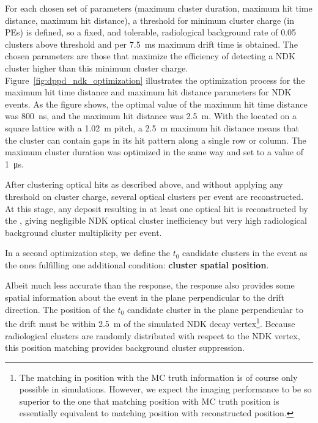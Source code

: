 For each chosen set of parameters (maximum cluster duration, maximum hit time distance, maximum hit distance), a threshold for minimum cluster charge (in PEs) is defined, so a fixed, and tolerable, radiological background rate of 0.05 clusters above threshold and per \SI{7.5}{\milli\s} maximum drift time is obtained. The chosen parameters are those that maximize the efficiency of detecting a NDK cluster higher than this minimum cluster charge. Figure~\ref{fig:dppd_ndk_optimization} illustrates the optimization process for the maximum hit time distance and maximum hit distance parameters for NDK events. As the figure shows, the optimal value of the maximum hit time distance was \SI{800}{\ns}, and the maximum hit distance was \SI{2.5}{\m}. With the  located on a square lattice with a \SI{1.02}{\m} pitch, a \SI{2.5}{\m} maximum hit distance means that the cluster can contain gaps in its hit pattern along a single  row or column. The maximum cluster duration was optimized in the same way and set to a value of \SI{1}{\us}.

After clustering optical hits as described above, and without applying any threshold on cluster charge, several optical clusters per event are reconstructed. At this stage, any deposit resulting in at least one optical hit is reconstructed by the , giving negligible NDK optical cluster inefficiency but very high radiological background cluster multiplicity per event. 

In a second optimization step, we define the $t_0$ candidate clusters in the event as the ones fulfilling one additional condition: {\bf cluster spatial position}.

Albeit much less accurate than the  response, the  response also provides some spatial information about the event in the plane perpendicular to the drift direction. The position of the $t_0$ candidate cluster in the plane perpendicular to the drift must be within \SI{2.5}{\m} of the simulated NDK decay vertex\footnote{The matching in position with the MC truth information is of course only possible in simulations. However, we expect the  imaging performance to be so superior to the  one that matching  position with MC truth position is essentially equivalent to matching  position with  reconstructed position.}. Because radiological clusters are randomly distributed with respect to the NDK vertex, this position matching provides background cluster suppression.


